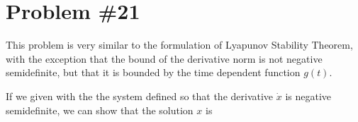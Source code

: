 
\section*{Problem \#21}

This problem is very similar to the formulation of Lyapunov Stability Theorem, with the exception that the bound of the derivative norm is not negative semidefinite, but that it is bounded by the time dependent function $g(t)$.


\noindent If we given with the the system defined so that the  derivative $\dot{x}$ is negative semidefinite, we can show that the solution $x$ is  
